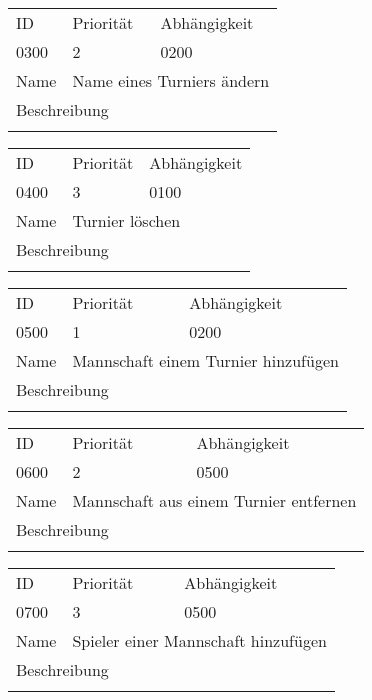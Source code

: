 	\begin{tabularx}{\textwidth}{|l|l|l|}
		ID & Priorität & Abhängigkeit \\
		0300 & 2 & 0200\\
		\hline
		Name & \multicolumn{2}{l}{Name eines Turniers ändern} \\
		\multicolumn{3}{l}{Beschreibung}\\
		\multicolumn{3}{l}{}\\
		\hline		 
	\end{tabularx}
	
	\begin{tabularx}{\textwidth}{|l|l|l|}
		ID & Priorität & Abhängigkeit \\
		0400 & 3 & 0100\\
		\hline
		Name & \multicolumn{2}{l}{Turnier löschen} \\
		\multicolumn{3}{l}{Beschreibung}\\
		\multicolumn{3}{l}{}\\
		\hline		 
	\end{tabularx}
	
	\begin{tabularx}{\textwidth}{|l|l|l|}
		ID & Priorität & Abhängigkeit \\
		0500 & 1 & 0200\\
		\hline
		Name & \multicolumn{2}{l}{Mannschaft einem Turnier hinzufügen} \\
		\multicolumn{3}{l}{Beschreibung}\\
		\multicolumn{3}{l}{}\\
		\hline		 
	\end{tabularx}
	
	\begin{tabularx}{\textwidth}{|l|l|l|}
		ID & Priorität & Abhängigkeit \\
		0600 & 2 & 0500\\
		\hline
		Name & \multicolumn{2}{l}{Mannschaft aus einem Turnier entfernen} \\
		\multicolumn{3}{l}{Beschreibung}\\
		\multicolumn{3}{l}{}\\
		\hline		 
	\end{tabularx}
	
	\begin{tabularx}{\textwidth}{|l|l|l|}
		ID & Priorität & Abhängigkeit \\
		0700 & 3 & 0500\\
		\hline
		Name & \multicolumn{2}{l}{Spieler einer Mannschaft hinzufügen} \\
		\multicolumn{3}{l}{Beschreibung}\\
		\multicolumn{3}{l}{}\\
		\hline		 
	\end{tabularx}
	

